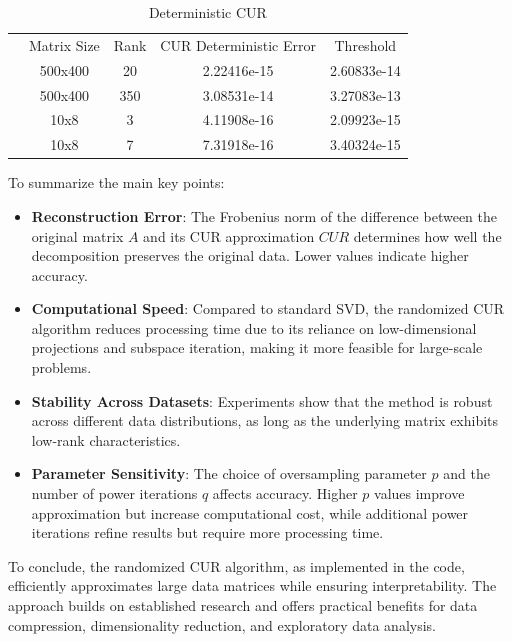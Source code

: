 \documentclass[11pt,a4paper]{article}
\begin{document}
\begin{table}
    \centering
    \begin{tabular}{ccccc}
         & Matrix Size & Rank & CUR Deterministic Error  & Threshold   \\
         & 500x400     & 20   & 2.22416e-15              & 2.60833e-14 \\
         & 500x400     & 350  & 3.08531e-14              & 3.27083e-13 \\
         & 10x8        & 3    & 4.11908e-16              & 2.09923e-15 \\
         & 10x8        & 7    & 7.31918e-16              & 3.40324e-15 \\
    \end{tabular}
    \caption{Deterministic CUR}
    \label{tab:my_label_2}
\end{table}


To summarize the main key points:
\begin{itemize}
\item \textbf{Reconstruction Error}: The Frobenius norm of the difference between the original matrix $ A $ and its CUR approximation $ CUR $ determines how well the decomposition preserves the original data. Lower values indicate higher accuracy.
\item \textbf{Computational Speed}: Compared to standard SVD, the randomized CUR algorithm reduces processing time due to its reliance on low-dimensional projections and subspace iteration, making it more feasible for large-scale problems.
\item \textbf{Stability Across Datasets}: Experiments show that the method is robust across different data distributions, as long as the underlying matrix exhibits low-rank characteristics.
\item \textbf{Parameter Sensitivity}: The choice of oversampling parameter $ p $ and the number of power iterations $ q $ affects accuracy. Higher $ p $ values improve approximation but increase computational cost, while additional power iterations refine results but require more processing time.
\end{itemize}
To conclude, the randomized CUR algorithm, as implemented in the code, efficiently approximates large data matrices while ensuring interpretability. The approach builds on established research and offers practical benefits for data compression, dimensionality reduction, and exploratory data analysis.
\end{document}
